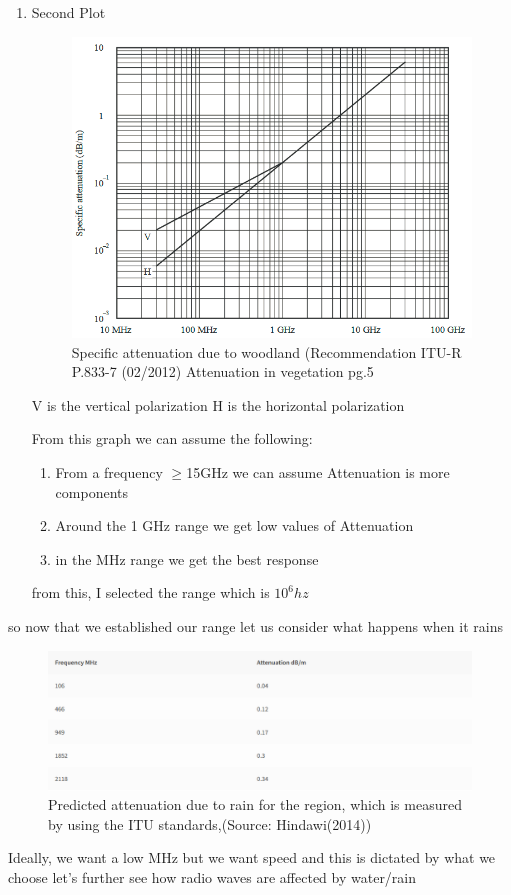 \begin{enumerate}
	\item Second Plot
\begin{figure}[h!]
		\centering
		\includegraphics[width=0.5\linewidth]{Images/ITU attteuntion.png}
		\caption{Specific attenuation due to woodland (Recommendation ITU-R P.833-7 (02/2012) Attenuation in vegetation pg.5}
		\label{Specific attenuation due to woodland (Recommendation ITU-R P.833-7 (02/2012) Attenuation in vegetation pg.5}
		\end{figure}
	V is the vertical polarization
	H is the horizontal polarization

	From this graph we  can assume the following:
	\begin{enumerate}
		\item From a frequency $\ge$15GHz we can assume Attenuation is more components
		\item Around the 1 GHz range we  get low values of Attenuation
		\item in the  MHz range we get the best response
	\end{enumerate}
	from this, I selected the  range which is  $10^6 hz$
	
\end{enumerate}
\newpage
so now that  we  established our range let us consider  what happens when it rains\cite{Sabetahd_Mousavi_Ghasemi_Vafaei_Poursorkhabi_Mohammadzadeh_Zandi_2022}

\begin{figure}[h!]
	\begin{center}
		
	\includegraphics[width=\linewidth]{Images/atteuntion_2.png}\par
	\caption{Predicted attenuation due to rain for the region, which is measured by using the ITU standards,(Source: Hindawi(2014))}
	\label{Predicted attenuation due to rain for the region, which is measured by using the ITU standards,(source: Hindawi(2014))}
		\end{center}
\end{figure}
Ideally, we want a low MHz but we want speed and this  is dictated by what we choose let's further see how radio waves are affected by water/rain
